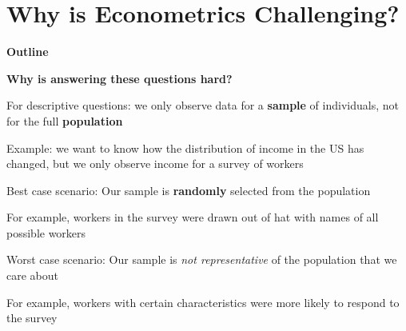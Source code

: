 \documentclass[11pt, aspectratio=169]{beamer}
\newenvironment{wideitemize}{\itemize\addtolength{\itemsep}{5pt}}{\enditemize}
\begin{document}
\section{Why is Econometrics Challenging?}
	\begin{frame}{\bf \large Outline}
	\tableofcontents[currentsection]
\end{frame}
\begin{frame}{\bf \large Why is answering these questions hard?}

\begin{wideitemize}
\item
For descriptive questions: we only observe data for a \textbf{sample} of individuals, not for the full \textbf{population}
	\begin{wideitemize}
		\item 
		Example: we want to know how the distribution of income in the US has changed, but we only observe income for a survey of workers
	\end{wideitemize}
\pause

\item Best case scenario: Our sample is \textbf{randomly} selected from the population \\
	\begin{wideitemize}
		\item 
		For example, workers in the survey were drawn out of hat with names of all possible workers

	\end{wideitemize}

\pause 

\item Worst case scenario: Our sample is \textit{not representative} of the population that we care about
	\begin{wideitemize}
		\item For example, workers with certain characteristics were more likely to respond to the survey
	\end{wideitemize}
\end{wideitemize}

\end{frame}
\end{document}
